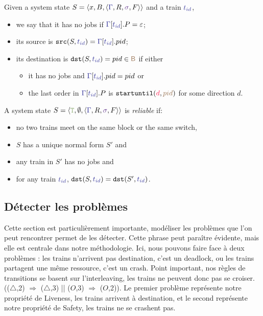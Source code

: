 \documentclass[runningheads]{llncs}
\newcommand{\tuple}[1]{\ensuremath{\langle #1\rangle}}
\newcommand{\dirFmt}[1]{{\color{dircolor} #1}}
\newcommand{\posFmt}[1]{{\color{poscolor}{#1}}}
\newcommand{\blocks}{{\posFmt{\mathsf{B}}}}
\newcommand{\swFmt}[1]{{\color{swcolor}{#1}}}
\newcommand{\switches}{\ensuremath{\swFmt{\sigma}}}
\newcommand{\trainFmt}[1]{{\color{traincolor} #1}}
\newcommand{\trainSeq}{\trainFmt{\Gamma\xspace}}
\newcommand{\tid}[1]{\ensuremath{\trainFmt{t_{#1}}}}
\newcommand{\su}[2]{{\mbox{$\mathtt{startuntil}(\dirFmt{#1}, \posFmt{#2})$}}\xspace}
\newcommand{\emptyTrainProg}{\varepsilon}
\newcommand{\regulator}{\ensuremath{R}}
\newcommand{\signals}{\ensuremath{F}}
\newcommand{\stateTuple}[4]{\tuple{#1, #2, #3, #4}}
\newcommand{\guardFmt}[1]{{\color{guardcolor} \ensuremath{\mathtt{#1}}}}
\newcommand{\guardT}{\guardFmt{T}}
\newcommand{\redTuple}[3]{\ensuremath{\tuple{#1, #2, #3}}}
\begin{document}
Given a system state  $S = \redTuple{x}{B}{\stateTuple{\trainSeq{}}{\regulator}{\switches}{\signals}}$ and a train $\tid{id}$, 
\begin{itemize}
	\item   we say that it has no jobs if  $\trainSeq{}[\tid{id}].P = \emptyTrainProg$;
	\item its source is $\mathtt{src}(S, \tid{id}) = \trainSeq{}[\tid{id}].pid$;
	\item its destination is $\mathtt{dst}(S, \tid{id}) = pid \in \blocks $ if either
	\begin{itemize}
		\item  it has no jobs and  $\trainSeq{}[\tid{id}].pid = pid$  or
		\item  the last order in  $\trainSeq{}[\tid{id}].P$ is $\su{d}{pid}$ for some direction $d$.
	\end{itemize}
\end{itemize}

A system state $S = \redTuple{\guardT}{\emptyset}{\stateTuple{\trainSeq{}}{\regulator}{\switches}{\signals}} $  is \emph{reliable} if: 
\begin{itemize}
	\item  no two trains meet on the same block or the same switch, 
	\item $S$ has  a unique normal form $S'$ and 
	\item any train in $S'$ has no jobs and 
	\item for any train $\tid{id}$, $\mathtt{dst}(S, \tid{id}) =  \mathtt{dst}(S', \tid{id})$. 
\end{itemize}

\subsection{Détecter les problèmes}
Cette section est particulièrement importante, modéliser les problèmes que l'on peut rencontrer permet de les détecter.
Cette phrase peut paraître évidente, mais elle est centrale dans notre méthodologie. Ici, nous pouvons faire face à deux problèmes : 
les trains n'arrivent pas destination, c'est un deadlock, ou les trains partagent une même ressource, c'est un crash. 
Point important, nos règles de transitions se basent sur l'interleaving, les trains ne peuvent donc pas se croiser. (($\triangle$,2) $\Rightarrow$ ($\triangle$,3) || ($O$,3) $\Rightarrow$ ($O$,2)).
Le premier problème représente notre propriété de Liveness, les trains arrivent à destination, et le second représente notre propriété de Safety, les trains ne se crashent pas.
\end{document}
